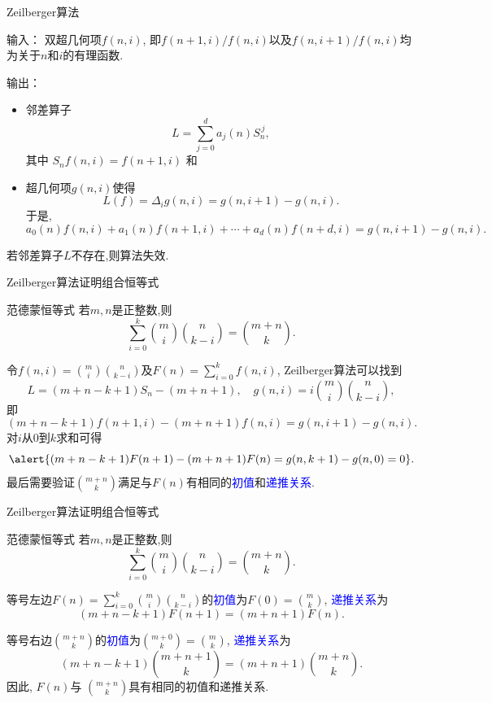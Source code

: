 \documentclass[punct]{ctexbeamer}
\newcommand{\blue}{\textcolor{blue}}
\begin{document}
\begin{frame}{Zeilberger算法}



        输入：
        双超几何项$f(n,i)$, 即$f(n+1,i)/f(n,i)$以及$f(n,i+1)/f(n,i)$均为关于$n$和$i$的有理函数.


        输出：
        \begin{itemize}
            \item 邻差算子$$L=\sum_{j=0}^{d}a_j(n)S_n^{\, j},$$ 其中 $S_n f(n, i)= f(n+1, i)$ 和

            \item 超几何项$g(n,i)$使得
             $$L(f)=\Delta_i g(n,i) =g(n,i+1)-g(n,i).$$
             于是,
            $$a_0(n)f(n,i)+a_1(n)f(n+1,i)+\cdots+a_d(n)f(n+d,i)=g(n,i+1)-g(n,i).$$

        \end{itemize}

   若邻差算子$L$不存在,则算法失效.


\end{frame}

\begin{frame}{Zeilberger算法证明组合恒等式}
\begin{block}{范德蒙恒等式}
    若$m,n$是正整数,则
	$$
    \sum_{i=0}^{k}
    \binom{m}{i}
    \binom{n}{k-i} = \binom{m+n}{k}.$$
\end{block}

令$f(n,i)=\binom{m}{i}\binom{n}{k-i}$及$F(n)=\sum_{i=0}^{k}f(n,i)$, Zeilberger算法可以找到
$$L=(m+n-k+1)S_n-(m+n+1), \quad g(n,i)=i\binom{m}{i}\binom{n}{k-i},$$
即
$$(m+n-k+1)f(n+1,i)-(m+n+1)f(n,i)=g(n,i+1)-g(n,i).$$
对$i$从$0$到$k$求和可得
$$\alert{(m+n-k+1)F(n+1)-(m+n+1)F(n)=g(n,k+1)-g(n,0)=0}.$$
最后需要验证$\binom{m+n}{k}$满足与$F(n)$有相同的\blue{初值}和\blue{递推关系}.
\end{frame}

\begin{frame}{Zeilberger算法证明组合恒等式}
    \begin{block}{范德蒙恒等式}
        若$m,n$是正整数,则
        $$
        \sum_{i=0}^{k}
        \binom{m}{i}
        \binom{n}{k-i} = \binom{m+n}{k}.$$
    \end{block}


等号左边$F(n)=\sum_{i=0}^{k}\binom{m}{i}\binom{n}{k-i}$的\blue{初值}为${F(0)=\binom{m}{k}}$, \blue{递推关系}为
    $${(m+n-k+1)F(n+1)=(m+n+1)F(n)}.$$

等号右边$\binom{m+n}{k}$的\blue{初值}为${\binom{m+0}{k} = \binom{m}{k}}$, \blue{递推关系}为
$${(m+n-k+1)\binom{m+n+1}{k}=(m+n+1)\binom{m+n}{k}}.$$
因此, $F(n)$与 $\binom{m+n}{k}$具有相同的{初值}和{递推关系}.
\end{frame}
\end{document}

